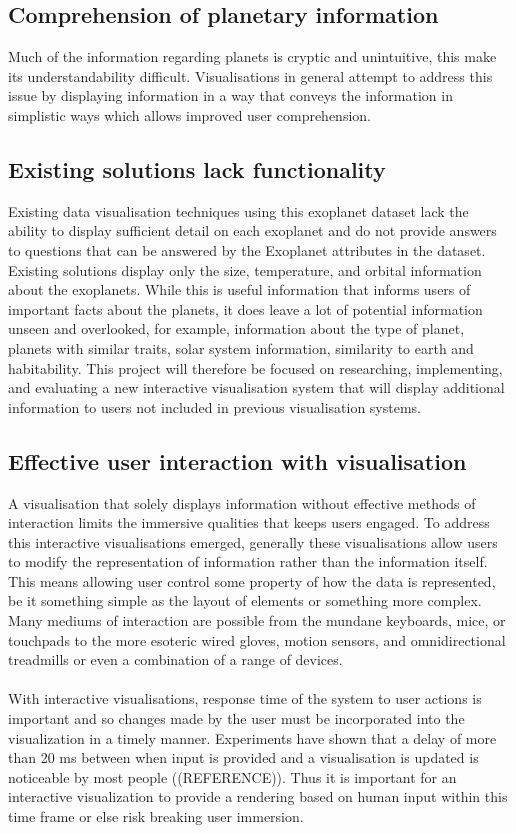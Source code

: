 \subsection{Comprehension of planetary information}
Much of the information regarding planets is cryptic and unintuitive, this make its understandability difficult. Visualisations in general attempt to address this issue by displaying information in a way that conveys the information in simplistic ways which allows improved user comprehension.

\subsection{Existing solutions lack functionality}
Existing data visualisation techniques using this exoplanet dataset lack the ability to display sufficient detail on each exoplanet and do not provide answers to questions that can be answered by the Exoplanet attributes in the dataset. Existing solutions display only the size, temperature, and orbital information about the exoplanets. While this is useful information that informs users of important facts about the planets, it does leave a lot of potential information unseen and overlooked, for example, information about the type of planet, planets with similar traits, solar system information, similarity to earth and habitability. This project will therefore be focused on researching, implementing, and evaluating a new interactive visualisation system that will display additional information to users not included in previous visualisation systems.

\subsection{Effective user interaction with visualisation}
A visualisation that solely displays information without effective methods of interaction limits the immersive qualities that keeps users engaged. To address this interactive visualisations emerged, generally these visualisations allow users to modify the representation of information rather than the information itself. This means allowing user control some property of how the data is represented, be it something simple as the layout of elements or something more complex. Many mediums of interaction are possible from the mundane keyboards, mice, or touchpads to the more esoteric wired gloves, motion sensors, and omnidirectional treadmills or even a combination of a range of devices.
\\\\
With interactive visualisations, response time of the system to user actions is important and so changes made by the user must be incorporated into the visualization in a timely manner. Experiments have shown that a delay of more than 20 ms between when input is provided and a visualisation is updated is noticeable by most people ((REFERENCE)). Thus it is important for an interactive visualization to provide a rendering based on human input within this time frame or else risk breaking user immersion.
\\\\

